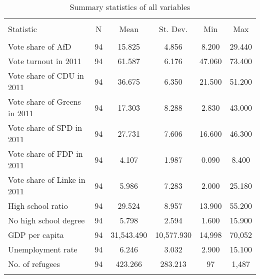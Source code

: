 \documentclass[10pt,a4paper]{article}
\author{Md Mujahedul Islam}
\begin{document}
\begin{table}[!htbp] \centering 
  \caption{Summary statistics of all variables} 
  \label{} 
\small 
\begin{tabular}{@{\extracolsep{5pt}}lccccc} 
\\[-1.8ex]\hline 
\hline \\[-1.8ex] 
Statistic & \multicolumn{1}{c}{N} & \multicolumn{1}{c}{Mean} & \multicolumn{1}{c}{St. Dev.} & \multicolumn{1}{c}{Min} & \multicolumn{1}{c}{Max} \\ 
\hline \\[-1.8ex] 
Vote share of AfD & 94 & 15.825 & 4.856 & 8.200 & 29.440 \\ 
Vote turnout in 2011 & 94 & 61.587 & 6.176 & 47.060 & 73.400 \\ 
Vote share of CDU in 2011 & 94 & 36.675 & 6.350 & 21.500 & 51.200 \\ 
Vote share of Greens in 2011 & 94 & 17.303 & 8.288 & 2.830 & 43.000 \\ 
Vote share of SPD in 2011 & 94 & 27.731 & 7.606 & 16.600 & 46.300 \\ 
Vote share of FDP in 2011 & 94 & 4.107 & 1.987 & 0.090 & 8.400 \\ 
Vote share of Linke in 2011 & 94 & 5.986 & 7.283 & 2.000 & 25.180 \\ 
High school ratio & 94 & 29.524 & 8.957 & 13.900 & 55.200 \\ 
No high school degree & 94 & 5.798 & 2.594 & 1.600 & 15.900 \\ 
GDP per capita & 94 & 31,543.490 & 10,577.930 & 14,998 & 70,052 \\ 
Unemployment rate & 94 & 6.246 & 3.032 & 2.900 & 15.100 \\ 
No. of refugees & 94 & 423.266 & 283.213 & 97 & 1,487 \\ 
\hline \\[-1.8ex] 
\end{tabular} 
\end{table} 
\end{document}
